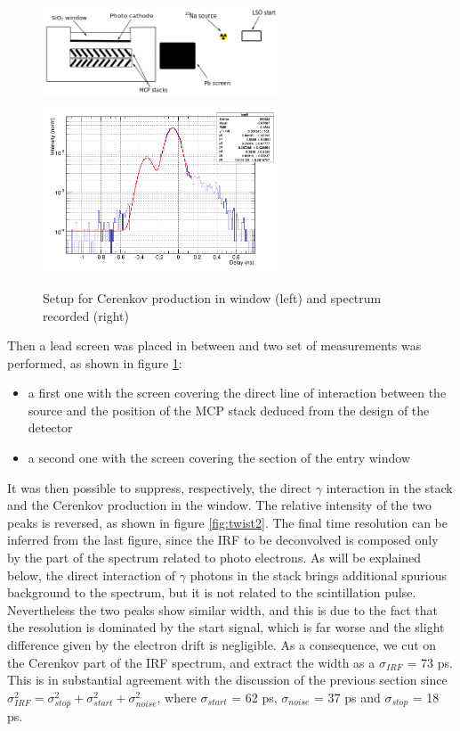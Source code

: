 \begin{figure}[htbp]
\begin{center}
\includegraphics[width=7cm]{../Pictures/Chapter_8/screen_irf.png}
\includegraphics[width=7cm]{../Pictures/Chapter_8/turn_2.png}
\end{center}
\caption[Setup for Cerenkov production in the window]{Setup for Cerenkov production in window (left) and spectrum recorded (right)}
\label{fig:twist1}
\end{figure}
Then a lead screen was placed in between and two set of measurements was performed, as shown in figure \ref{fig:twist1}:
\begin{itemize}
\item a first one with the screen covering the direct line of interaction between the source and the position of the MCP stack deduced from the design of the detector
\item a second one with the screen covering the section of the entry window
\end{itemize}
It was then possible to suppress, respectively, the direct $\gamma$ interaction in the stack and the Cerenkov production in the window. The relative intensity of the two peaks is reversed, as shown in figure \ref{fig:twist2}. 
The final time resolution can be inferred from the 
last figure, since the IRF to be deconvolved is composed only by the part of the spectrum related to photo electrons. As will be explained below, the direct interaction of $\gamma$ photons in the stack brings additional spurious background to the spectrum, but it is not related to the scintillation pulse. Nevertheless the two peaks show similar width, and this is due to the fact that the resolution is dominated by the start signal, which is far worse and the slight difference given by the electron drift is negligible.
As a consequence, we cut on the Cerenkov part of the IRF spectrum, and extract the width as a $\sigma _{IRF}$ = 73 ps. This is in substantial agreement with the discussion of the previous section since $\sigma _{IRF}^{2} = \sigma _{stop}^{2} + \sigma _{start}^{2} + \sigma _{noise}^{2}$, where $\sigma _{start}$ = 62 ps, $\sigma _{noise}$ = 37 ps and $\sigma _{stop}$ = 18 ps.

